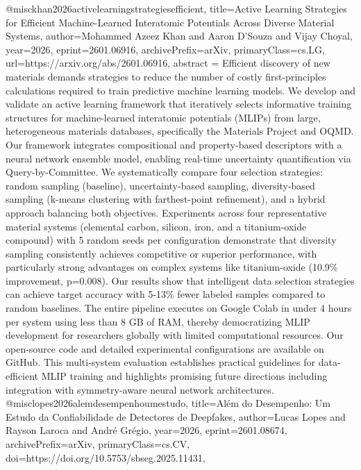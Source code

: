 {}@misc{khan2026activelearningstrategiesefficient,
      title={Active Learning Strategies for Efficient Machine-Learned Interatomic Potentials Across Diverse Material Systems}, 
      author={Mohammed Azeez Khan and Aaron D'Souza and Vijay Choyal},
      year={2026},
      eprint={2601.06916},
      archivePrefix={arXiv},
      primaryClass={cs.LG},
      url={https://arxiv.org/abs/2601.06916},
      abstract = {Efficient discovery of new materials demands strategies to reduce the number of costly first-principles calculations required to train predictive machine learning models. We develop and validate an active learning framework that iteratively selects informative training structures for machine-learned interatomic potentials (MLIPs) from large, heterogeneous materials databases, specifically the Materials Project and OQMD. Our framework integrates compositional and property-based descriptors with a neural network ensemble model, enabling real-time uncertainty quantification via Query-by-Committee. We systematically compare four selection strategies: random sampling (baseline), uncertainty-based sampling, diversity-based sampling (k-means clustering with farthest-point refinement), and a hybrid approach balancing both objectives. Experiments across four representative material systems (elemental carbon, silicon, iron, and a titanium-oxide compound) with 5 random seeds per configuration demonstrate that diversity sampling consistently achieves competitive or superior performance, with particularly strong advantages on complex systems like titanium-oxide (10.9\% improvement, p=0.008). Our results show that intelligent data selection strategies can achieve target accuracy with 5-13\% fewer labeled samples compared to random baselines. The entire pipeline executes on Google Colab in under 4 hours per system using less than 8 GB of RAM, thereby democratizing MLIP development for researchers globally with limited computational resources. Our open-source code and detailed experimental configurations are available on GitHub. This multi-system evaluation establishes practical guidelines for data-efficient MLIP training and highlights promising future directions including integration with symmetry-aware neural network architectures.}
}@misc{lopes2026alemdesempenhoumestudo,
      title={Al\'em do Desempenho: Um Estudo da Confiabilidade de Detectores de Deepfakes}, 
      author={Lucas Lopes and Rayson Laroca and André Grégio},
      year={2026},
      eprint={2601.08674},
      archivePrefix={arXiv},
      primaryClass={cs.CV},
      doi={https://doi.org/10.5753/sbseg.2025.11431},
}
